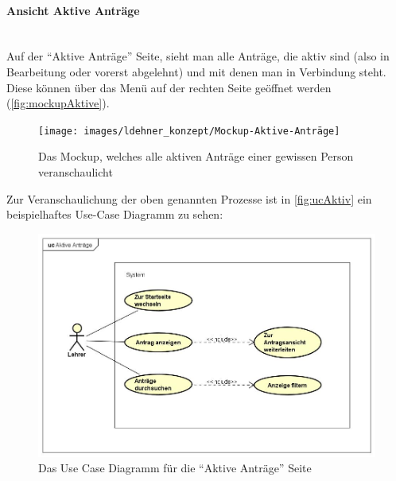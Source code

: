 \paragraph{Ansicht Aktive Anträge}
~\\
Auf der \enquote{Aktive Anträge} Seite, sieht man alle Anträge, die aktiv sind (also in Bearbeitung oder vorerst abgelehnt) und mit denen man in Verbindung steht. Diese können über das Menü auf der rechten Seite geöffnet werden (\autoref{fig:mockupAktive}).
\begin{figure}[H]
	\centering
	\texttt{[image: images/ldehner\_konzept/Mockup-Aktive-Anträge]}
	\caption[Mokup aktive Anträge]{Das Mockup, welches alle aktiven Anträge einer gewissen Person veranschaulicht}
	\label{fig:mockupAktive}
\end{figure}
Zur Veranschaulichung der oben genannten Prozesse ist in \autoref{fig:ucAktiv} ein beispielhaftes Use-Case Diagramm zu sehen: 
\begin{figure}[H]
	\centering
	\includegraphics[width=1\linewidth]{images/ldehner_konzept/uc-active}
	\caption[Use Case Diagramm Aktive Anträge]{Das Use Case Diagramm für die \enquote{Aktive Anträge} Seite}
	\label{fig:ucAktiv}
\end{figure}
\newpage
